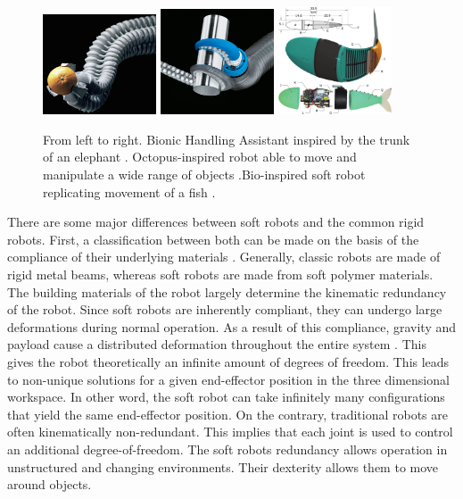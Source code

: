 \begin{figure}[H]       
    \includegraphics[width = 0.3\textwidth]{Figures/Introduction/bhasinasappel.jpg}   
    \hspace{0px}
    \includegraphics[width = 0.3\textwidth]{Figures/Introduction/tentaclegripper.jpg}
    \hspace{0px}
    \includegraphics[width = 0.3\textwidth]{Figures/Introduction/fish.jpg}
    \caption{From left to right. Bionic Handling Assistant inspired by the trunk of an elephant \cite{BHA}. Octopus-inspired robot able to move and manipulate a wide range of objects \cite{octopus}.Bio-inspired soft robot replicating movement of a fish \cite{marchese2014}.}
    \label{fig1:softexample}
\end{figure}

There are some major differences between soft robots and the common rigid robots. First, a classification between both can be made on the basis of the compliance of their underlying materials \cite{Bionics2008}. Generally, classic robots are  made of rigid metal beams, whereas soft robots are made from soft polymer materials. 
The building materials of the robot largely determine the kinematic redundancy of the robot. Since soft robots are inherently compliant, they can undergo large deformations during normal operation. As a result of this compliance, gravity and payload cause a distributed deformation throughout the entire system . This gives the robot theoretically an infinite amount of degrees of freedom. This leads to non-unique solutions for a given end-effector position in the three dimensional workspace. In other word, the soft robot can take infinitely many configurations that yield the same end-effector position. On the contrary, traditional robots are often kinematically non-redundant. This implies that each joint is used to control an additional degree-of-freedom. The soft robots redundancy allows operation in unstructured and changing environments. Their dexterity allows them to move around objects.

